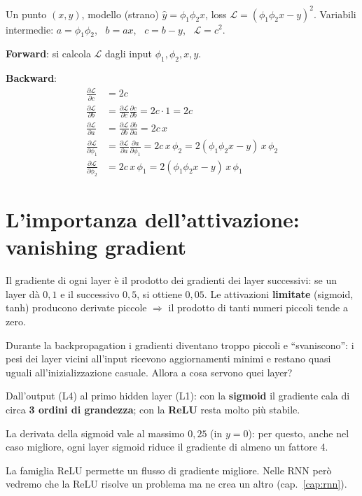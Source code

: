 \begin{esempio}
Un punto $(x,y)$, modello (strano) $\hat y = \phi_1\phi_2 x$, loss $\mathcal{L} = (\phi_1\phi_2x - y)^2$.
Variabili intermedie: $a=\phi_1\phi_2$, \ $b = ax$, \ $c = b - y$, \ $\mathcal{L} = c^2$.

\textbf{Forward}: si calcola $\mathcal{L}$ dagli input $\phi_1,\phi_2,x,y$.

\textbf{Backward}:
\begin{align*}
\frac{\partial\mathcal{L}}{\partial c} &= 2c\\
\frac{\partial\mathcal{L}}{\partial b} &= \frac{\partial\mathcal{L}}{\partial c}\frac{\partial c}{\partial b} = 2c\cdot 1 = 2c\\
\frac{\partial\mathcal{L}}{\partial a} &= \frac{\partial\mathcal{L}}{\partial b}\frac{\partial b}{\partial a} = 2c\,x\\
\frac{\partial\mathcal{L}}{\partial \phi_1} &= \frac{\partial\mathcal{L}}{\partial a}\frac{\partial a}{\partial \phi_1} = 2c\,x\,\phi_2 = 2(\phi_1\phi_2x-y)\,x\,\phi_2\\
\frac{\partial\mathcal{L}}{\partial \phi_2} &= 2c\,x\,\phi_1 = 2(\phi_1\phi_2x-y)\,x\,\phi_1
\end{align*}
\end{esempio}

\section{L'importanza dell'attivazione: vanishing gradient}
Il gradiente di ogni layer è il prodotto dei gradienti dei layer successivi: se un layer dà $0{,}1$ e il successivo $0{,}5$,
si ottiene $0{,}05$. Le attivazioni \textbf{limitate} (sigmoid, tanh) producono derivate piccole $\Rightarrow$ il prodotto
di tanti numeri piccoli tende a zero.
\begin{definizione}
Durante la backpropagation i gradienti diventano troppo piccoli e ``svaniscono'': i pesi dei layer vicini all'input ricevono
aggiornamenti minimi e restano quasi uguali all'inizializzazione casuale. Allora a cosa servono quei layer?
\end{definizione}
\begin{esempio}
Dall'output (L4) al primo hidden layer (L1): con la \textbf{sigmoid} il gradiente cala di circa \textbf{3 ordini di
grandezza}; con la \textbf{ReLU} resta molto più stabile.
\end{esempio}
\begin{integrazione}
La derivata della sigmoid vale al massimo $0{,}25$ (in $y=0$): per questo, anche nel caso migliore, ogni layer sigmoid
riduce il gradiente di almeno un fattore 4.
\end{integrazione}
La famiglia ReLU permette un flusso di gradiente migliore. Nelle RNN però vedremo che la ReLU risolve un problema ma ne crea
un altro (cap.~\ref{cap:rnn}).

